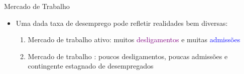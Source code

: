 \documentclass[10pt]{beamer}
\begin{document}
\begin{frame}{Mercado de Trabalho}
    \begin{itemize}
        \item Uma dada taxa de desemprego pode refletir realidades bem diversas:\bigskip
        \begin{enumerate}
            \item Mercado de trabalho ativo: muitos \textcolor{purple}{desligamentos} e muitas \textcolor{blue}{admissões}\medskip
            \item Mercado de trabalho : poucos desligamentos, poucas admissões e contingente estagnado de desempregados
        \end{enumerate}
    \end{itemize}
\end{frame}
\end{document}
